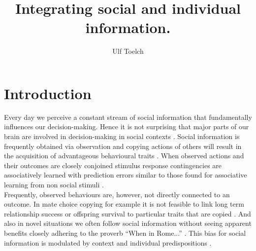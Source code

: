 \documentclass[jou]{apa}
\title{Integrating social and individual information.}
\author{Ulf Toelch}
\affiliation{Mind and Brain \\ Humboldt University}
\begin{document}
\maketitle
\section{Introduction}
Every day we perceive a constant stream of social information that fundamentally influences our decision-making. Hence it is not surprising that major parts of our brain are involved in decision-making in social contexts \cite{rilling_neuroscience_2011,frith_mechanisms_2012}. Social information is frequently obtained via observation and copying actions of others will result in the acquisition of advantageous behavioural traits \cite{rendell_why_2010}. When observed actions and their outcomes are closely conjoined stimulus response contingencies are associatively learned with prediction errors similar to those found for associative learning from non social stimuli \cite{behrens_associative_2008, behrens_computation_2009,heyes_whats_2011}. \\
Frequently, observed behaviours are, however, not directly connected to an outcome. In mate choice copying for example it is not feasible to link long term relationship success or offspring survival to particular traits that are copied \cite{little_social_2011}. And also in novel situations we often follow social information without seeing apparent benefits closely adhering to the proverb ``When in Rome...'' \cite{reader_social_2008}. This bias for social information  \cite{mesoudi_bias_2006} is modulated by context and individual predispositions \cite{efferson_conformists_2008, toelch_decreased_2009}.\\
\end{document}
